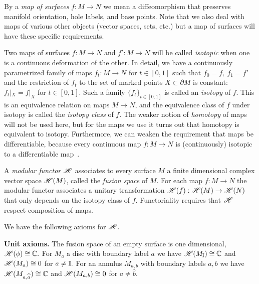\documentclass[aps, tightenlines, letterpaper, onecolumn, superscriptaddress, notitlepage, 11pt, groupedaddress]{revtex4-1}
\begin{document}
By a \emph{map of surfaces} $f:M\to N$ we mean 
a diffeomorphism that preserves
manifold orientation, hole labels, and base points.
Note that we also deal with maps of various other objects
(vector spaces, sets, etc.)
but a map of surfaces will have these specific
requirements.

Two maps of surfaces $f:M\to N$ and $f':M\to N$
will be called \emph{isotopic}
when one is a continuous deformation of the other.
In detail,
we have a continuously
parametrized family of maps $f_t:M\to N$ for $t\in [0, 1]$
such that $f_0=f,\ f_1=f'$
and the restriction of $f_t$ to the 
set of marked points $X\subset\partial M$ is constant:
$f_t|_{X} = f|_{X}$ for $t\in [0, 1].$
Such a family $\{f_t\}_{t\in [0,1]}$ is called an \emph{isotopy}
of $f.$
This is an equivalence relation on maps $M\to N$, and the equivalence
class of $f$ under isotopy is called the \emph{isotopy class} of $f.$
The weaker notion of \emph{homotopy} of maps will not be used
here, but for the maps we use
it turns out that homotopy is equivalent to isotopy.
Furthermore, we can weaken the requirement that maps be differentiable,
because every continuous map $f:M\to N$ is (continuously)
isotopic to a differentiable map~\cite{Farb2011}.

A \emph{modular functor} $\mathscr{H}$ associates to every
surface $M$ a finite dimensional complex
vector space $\mathscr{H}(M)$, called the \emph{fusion space} of $M$.
For each map $f:M\to N$
the modular functor associates a
unitary transformation $\mathscr{H}(f) : \mathscr{H}(M)\to\mathscr{H}(N)$
that only depends on the isotopy class of $f.$
Functoriality requires that $\mathscr{H}$
respect composition of maps.

We have the following axioms for $\mathscr{H}.$

{\bf Unit axioms.}
The fusion space of an empty surface is one dimensional, 
$\mathscr{H}(\phi) \cong \mathbb{C}.$ %
For $M_a$ a disc with boundary label $a$ we have
$\mathscr{H}(M_{\mathbb{I}})\cong \mathbb{C}$ and 
$\mathscr{H}(M_a)\cong 0$ for $a\ne \mathbb{I}.$
For an annulus $M_{a,b}$ with boundary labels
$a, b$ we have
$\mathscr{H}(M_{a,\widehat{a}})\cong \mathbb{C}$ and 
$\mathscr{H}(M_{a,b})\cong 0$ for $a\ne \widehat{b}.$
\end{document}
